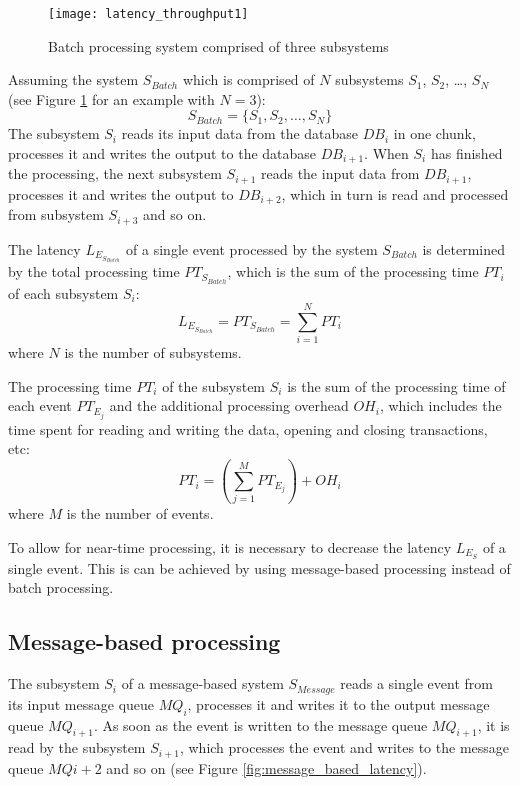 \begin{figure}[htbp]
	\centering
	\texttt{[image: latency\_throughput1]}
	\caption{Batch processing system comprised of three subsystems}
	\label{fig:batch_processing_latency}
\end{figure}

Assuming the system $S_{Batch}$ which is comprised of $N$ subsystems $S_1$, $S_2$, \ldots, $S_N$ (see Figure \ref{fig:batch_processing_latency} for an example with $N=3$):
\begin{displaymath}
S_{Batch} = \{S_1, S_2, \ldots, S_N\}
\end{displaymath}
The subsystem $S_i$ reads its input data from the database $DB_i$ in one chunk, processes it and writes the output to the database $DB_{i+1}$. When $S_i$ has finished the processing, the next subsystem $S_{i+1}$ reads the input data from $DB_{i+1}$, processes it and writes the output to $DB_{i+2}$, which in turn is read and processed from subsystem $S_{i+3}$ and so on.

The latency $L_{E_{S_{Batch}}}$ of a single event processed by the system $S_{Batch}$ is determined by the total processing time $PT_{S_{Batch}}$, which is the sum of the processing time $PT_i$ of each subsystem $S_i$:
\begin{displaymath}
L_{E_{S_{Batch}}} = PT_{S_{Batch}} = \sum_{i=1}^N PT_i
\end{displaymath}
where $N$ is the number of subsystems.

The processing time $PT_i$ of the subsystem $S_i$ is the sum of the processing time of each event $PT_{E_{j}}$ and the additional processing overhead $OH_i$, which includes the time spent for reading and writing the data, opening and closing transactions, etc:
\begin{displaymath}
PT_i = \left(\sum_{j=1}^M PT_{E_{j}}\right) + OH_i
\end{displaymath}
where $M$ is the number of events.

To allow for near-time processing, it is necessary to decrease the latency $L_{E_S}$ of a single event. This is can be achieved by using message-based processing instead of batch processing.

\subsection{Message-based processing}
The subsystem $S_i$ of a message-based system $S_{Message}$ reads a single event from its input message queue $MQ_i$, processes it and writes it to the output message queue $MQ_{i+1}$. As soon as the event is written to the message queue $MQ_{i+1}$, it is read by the subsystem $S_{i+1}$, which processes the event and writes to the message queue $MQ{i+2}$ and so on (see Figure \ref{fig:message_based_latency}).


